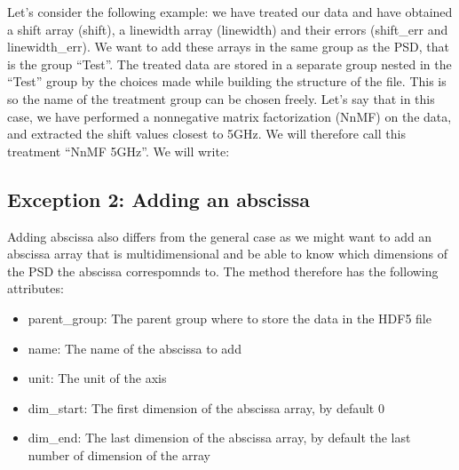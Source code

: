 \documentclass[letterpaper,10pt,english]{sphinxmanual}
\begin{document}
\sphinxAtStartPar
{}

\sphinxAtStartPar
Let’s consider the following example: we have treated our data and have obtained a shift array (shift), a linewidth array (linewidth) and their errors (shift\_err and linewidth\_err). We want to add these arrays in the same group as the PSD, that is the group “Test”. The treated data are stored in a separate group nested in the “Test” group by the choices made while building the structure of the file. This is so the name of the treatment group can be chosen freely. Let’s say that in this case, we have performed a non\sphinxhyphen{}negative matrix factorization (NnMF) on the data, and extracted the shift values closest to 5GHz. We will therefore call this treatment “NnMF \sphinxhyphen{} 5GHz”. We will write:

\begin{sphinxVerbatim}[commandchars=\\\{\}]
  
                       
                       
                       
                       
                       
\end{sphinxVerbatim}


\subsection{Exception 2: Adding an abscissa}
\label{\detokenize{source/hdf5_bls_package:exception-2-adding-an-abscissa}}
\sphinxAtStartPar
Adding abscissa also differs from the general case as we might want to add an abscissa array that is multi\sphinxhyphen{}dimensional and be able to know which dimensions of the PSD the abscissa correspomnds to. The  method therefore has the following attributes:
\begin{itemize}
\item {} 
\sphinxAtStartPar
parent\_group: The parent group where to store the data in the HDF5 file

\item {} 
\sphinxAtStartPar
name: The name of the abscissa to add

\item {} 
\sphinxAtStartPar
unit: The unit of the axis

\item {} 
\sphinxAtStartPar
dim\_start: The first dimension of the abscissa array, by default 0

\item {} 
\sphinxAtStartPar
dim\_end: The last dimension of the abscissa array, by default the last number of dimension of the array

\end{itemize}
\end{document}
